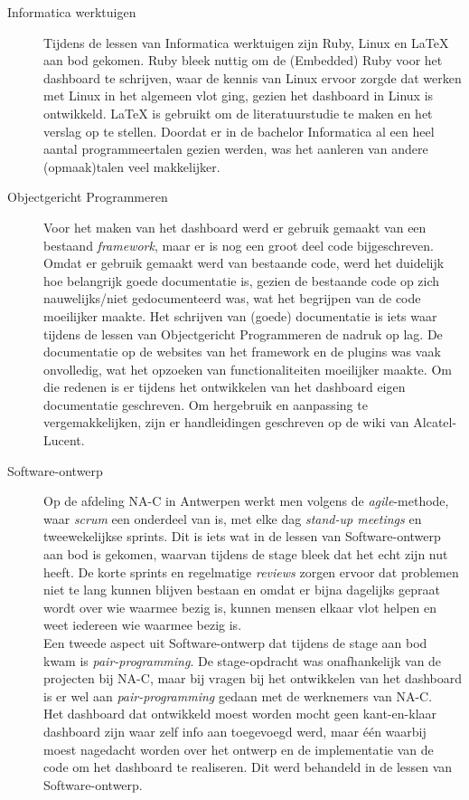 \documentclass[10pt,a4paper]{article}
\begin{document}
\begin{description}
\item[Informatica werktuigen]
Tijdens de lessen van Informatica werktuigen zijn Ruby, Linux en LaTeX aan bod gekomen. Ruby bleek nuttig om de (Embedded) Ruby voor het dashboard te schrijven, waar de kennis van Linux ervoor zorgde dat werken met Linux in het algemeen vlot ging, gezien het dashboard in Linux is ontwikkeld. LaTeX is gebruikt om de literatuurstudie te maken en het verslag op te stellen.
Doordat er in de bachelor Informatica al een heel aantal programmeertalen gezien werden, was het aanleren van andere (opmaak)talen veel makkelijker. 

\item[Objectgericht Programmeren]
Voor het maken van het dashboard werd er gebruik gemaakt van een bestaand \textit{framework}, maar er is nog een groot deel code bijgeschreven. Omdat er gebruik gemaakt werd van bestaande code, werd het duidelijk hoe belangrijk goede documentatie is, gezien de bestaande code op zich nauwelijks/niet gedocumenteerd was, wat het begrijpen van de code moeilijker maakte. Het schrijven van (goede) documentatie is iets waar tijdens de lessen van Objectgericht Programmeren de nadruk op lag. De documentatie op de websites van het framework en de plugins was vaak onvolledig, wat het opzoeken van functionaliteiten moeilijker maakte. Om die redenen is er tijdens het ontwikkelen van het dashboard eigen documentatie geschreven. Om hergebruik en aanpassing te vergemakkelijken, zijn er handleidingen geschreven op de wiki van Alcatel-Lucent.

\item[Software-ontwerp]
Op de afdeling NA-C in Antwerpen werkt men volgens de \textit{agile}-methode, waar \textit{scrum} een onderdeel van is, met elke dag \textit{stand-up meetings} en tweewekelijkse sprints. Dit is iets wat in de lessen van Software-ontwerp aan bod is gekomen, waarvan tijdens de stage bleek dat het echt zijn nut heeft. De korte sprints en regelmatige \textit{reviews} zorgen ervoor dat problemen niet te lang kunnen blijven bestaan en omdat er bijna dagelijks gepraat wordt over wie waarmee bezig is, kunnen mensen elkaar vlot helpen en weet iedereen wie waarmee bezig is.\\
Een tweede aspect uit Software-ontwerp dat tijdens de stage aan bod kwam is \textit{pair-programming}. De stage-opdracht was onafhankelijk van de projecten bij NA-C, maar bij vragen bij het ontwikkelen van het dashboard is er wel aan \textit{pair-programming} gedaan met de werknemers van NA-C. \\
Het dashboard dat ontwikkeld moest worden mocht geen kant-en-klaar dashboard zijn waar zelf info aan toegevoegd werd, maar \'e\'en waarbij moest nagedacht worden over het ontwerp en de implementatie van de code om het dashboard te realiseren. Dit werd behandeld in de lessen van Software-ontwerp.


\end{description}
\end{document}
